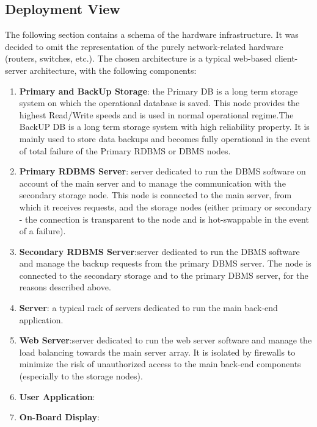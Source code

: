 \subsection{Deployment View}
The following section contains a schema of the hardware infrastructure.
It was decided to omit the representation of the purely network-related hardware (routers, switches, etc.).
The chosen architecture is a typical web-based client-server architecture,
with the following components:
\begin{enumerate}
\item \textbf{Primary and BackUp Storage}: the Primary DB is a long term storage system on which the operational database is saved. This node provides the highest Read/Write speeds and is used in normal operational regime.The BackUP DB is a long term storage system with high reliability property. It is mainly used to store data backups and becomes fully operational in the event of total failure of the Primary RDBMS or DBMS nodes.
\item \textbf{Primary RDBMS Server}: server dedicated to run the DBMS software on account of the main server  and to manage the communication with the secondary storage node. This node is connected to the main server, from which it receives requests, and the storage nodes (either primary or secondary - the connection is transparent to the node and is hot-swappable in the event of a failure).
\item \textbf{Secondary RDBMS Server}:server dedicated to run the DBMS software and
manage the backup requests from the primary DBMS server. The node is connected to the secondary storage and to the primary DBMS server, for the reasons described above.
\item \textbf{Server}: a typical rack of servers dedicated to run the main back-end application.
\item \textbf{Web Server}:server dedicated to run the web server software and manage the load balancing towards the main server array. It is isolated by firewalls to  minimize the risk of unauthorized access to the main back-end components (especially to the storage nodes).
\item \textbf{User Application}:
\item \textbf{On-Board Display}:

\end{enumerate}

